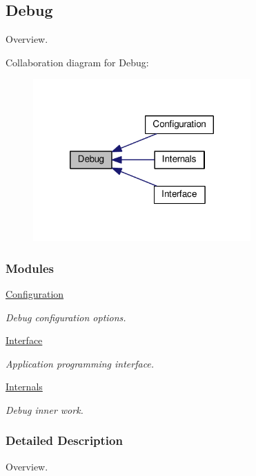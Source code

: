 \hypertarget{group__dbg}{\subsection{Debug}
\label{group__dbg}
}


Overview.  


Collaboration diagram for Debug\-:\nopagebreak
\begin{figure}[H]
\begin{center}
\leavevmode
\includegraphics[width=236pt]{group__dbg}
\end{center}
\end{figure}
\subsubsection*{Modules}
\begin{DoxyCompactItemize}
\item 
\hyperlink{group__dbg__cfg}{Configuration}
\begin{DoxyCompactList}\small\item\em Debug configuration options. \end{DoxyCompactList}\item 
\hyperlink{group__dbg__intf}{Interface}
\begin{DoxyCompactList}\small\item\em Application programming interface. \end{DoxyCompactList}\item 
\hyperlink{group__dbg__impl}{Internals}
\begin{DoxyCompactList}\small\item\em Debug inner work. \end{DoxyCompactList}\end{DoxyCompactItemize}


\subsubsection{Detailed Description}
Overview. 